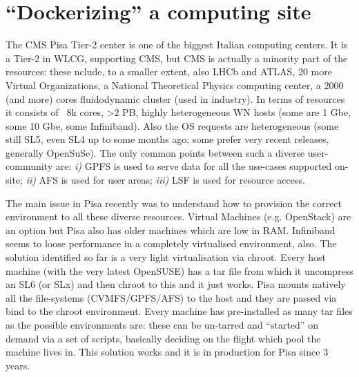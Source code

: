 \documentclass{PoS}
\begin{document}
\section{``Dockerizing'' a computing site}

The CMS Pisa Tier-2 center is one of the biggest Italian computing centers. It is a Tier-2 in WLCG, supporting CMS, but CMS is actually a minority part of the resources: these nclude, to a smaller extent, also LHCb and ATLAS, 20 more Virtual Organizations, a National Theoretical Physics computing center, a 2000 (and more) cores fluidodynamic cluster (used in industry). In terms of resources it consists of ~8k cores, >2 PB, highly heterogeneous WN hosts (some are 1 Gbe, some 10 Gbe, some Infiniband). Also the OS requests are heterogeneous (some still SL5, even SL4 up to some months ago; some prefer very recent releases, generally OpenSuSe). The only common points between such a diverse user-community are: {\em i)} GPFS is used to serve data for all the use-cases supported on-site; {\em ii)} AFS is used for user areas; {\em iii)} LSF is used for resource access.

The main issue in Pisa recently was to understand how to provision the correct environment to all these diverse resources. Virtual Machines (e.g. OpenStack) are an option but
Pisa also has older machines which are low in RAM. Infiniband seems to loose performance in a completely virtualised environment, also. The solution identified so far is a very light virtualisation via chroot. Every host machine (with the very latest OpenSUSE) has a tar file from which it uncompress an SL6 (or SLx) and then chroot to this and it just works. Pisa mounts natively all the file-systems (CVMFS/GPFS/AFS) to the host and they are passed via bind to the chroot environment. Every machine has pre-installed as many tar files as the possible environments are: these can be un-tarred and ``started'' on demand via a set of scripts, basically deciding on the flight which pool the machine lives in. This solution works and it is in production for Pisa since 3 years.
\end{document}
